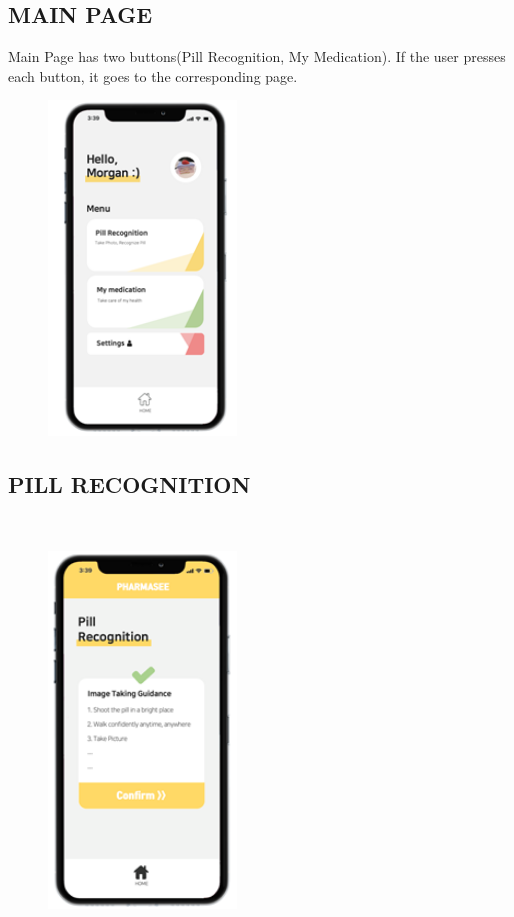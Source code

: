 \documentclass[conference]{IEEEtran}
\begin{document}
\subsection{MAIN PAGE}Main Page has two buttons(Pill Recognition, My Medication). If the user presses each button, it goes to the corresponding page.\\ 

\begin{figure}[h!]
\centering
\includegraphics[width=5cm]{imagefolder/mainpage.png}
\caption{}
\label{fig:map}
\end{figure}

\subsection{PILL RECOGNITION}\\

\begin{figure}[h!]
\centering
\includegraphics[width=5cm]{imagefolder/pillrecog1.png}
\caption{}
\label{fig:map}
\end{figure}
\end{document}
